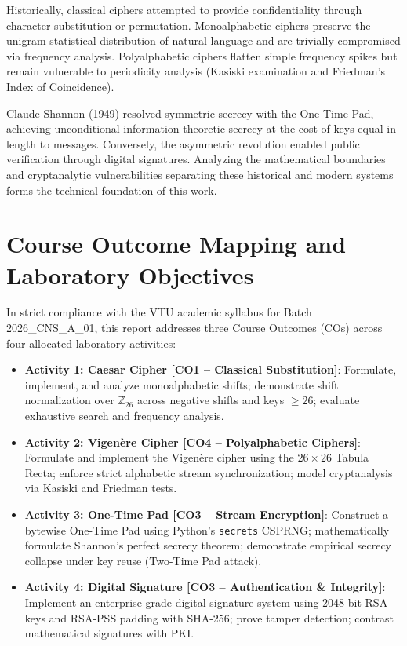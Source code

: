 \documentclass[12pt,a4paper]{report}
\begin{document}
Historically, classical ciphers attempted to provide confidentiality through character substitution or permutation. Monoalphabetic ciphers preserve the unigram statistical distribution of natural language and are trivially compromised via frequency analysis. Polyalphabetic ciphers flatten simple frequency spikes but remain vulnerable to periodicity analysis (Kasiski examination and Friedman's Index of Coincidence). 

Claude Shannon (1949) resolved symmetric secrecy with the One-Time Pad, achieving unconditional information-theoretic secrecy at the cost of keys equal in length to messages. Conversely, the asymmetric revolution enabled public verification through digital signatures. Analyzing the mathematical boundaries and cryptanalytic vulnerabilities separating these historical and modern systems forms the technical foundation of this work.

\section{Course Outcome Mapping and Laboratory Objectives}
In strict compliance with the VTU academic syllabus for Batch 2026\_CNS\_A\_01, this report addresses three Course Outcomes (COs) across four allocated laboratory activities:
\begin{itemize}[noitemsep,topsep=2pt]
    \item \textbf{Activity 1: Caesar Cipher [CO1 -- Classical Substitution]}: Formulate, implement, and analyze monoalphabetic shifts; demonstrate shift normalization over $\mathbb{Z}_{26}$ across negative shifts and keys $\ge 26$; evaluate exhaustive search and frequency analysis.
    \item \textbf{Activity 2: Vigen\`ere Cipher [CO4 -- Polyalphabetic Ciphers]}: Formulate and implement the Vigen\`ere cipher using the $26 \times 26$ Tabula Recta; enforce strict alphabetic stream synchronization; model cryptanalysis via Kasiski and Friedman tests.
    \item \textbf{Activity 3: One-Time Pad [CO3 -- Stream Encryption]}: Construct a bytewise One-Time Pad using Python's \texttt{secrets} CSPRNG; mathematically formulate Shannon's perfect secrecy theorem; demonstrate empirical secrecy collapse under key reuse (Two-Time Pad attack).
    \item \textbf{Activity 4: Digital Signature [CO3 -- Authentication \& Integrity]}: Implement an enterprise-grade digital signature system using 2048-bit RSA keys and RSA-PSS padding with SHA-256; prove tamper detection; contrast mathematical signatures with PKI.
\end{itemize}
\end{document}
